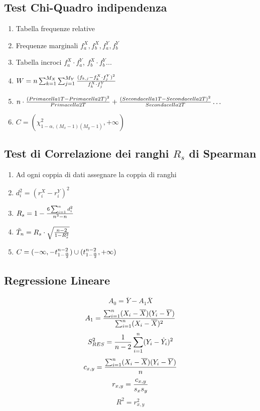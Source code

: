 \documentclass[12pt]{article}
\begin{document}
    \subsection{Test Chi-Quadro indipendenza}
    \begin{enumerate}
        \item Tabella frequenze relative
        \item Frequenze marginali $f^X_a, f^X_b, f^Y_a, f^Y_b$
        \item Tabella incroci $f^X_a \cdot f^Y_a$, $f^X_b \cdot f^Y_b$...
        \item $W = n \sum_{k=1}^{M_X} \sum_{j=1}^{M_Y} {{(f_{k,j} - f_k^X \cdot f_j^Y)^2} \over f_k^X \cdot f_j^Y}$
        \item $n \cdot {(Prima cella 1T - Prima cella 2T)^2 \over Prima cella 2T} + {(Seconda cella 1T - Seconda cella 2T)^2 \over Seconda cella 2T} \dots$
        \item $C = (\chi^2_{1-\alpha, (M_x - 1)(M_y - 1)}, +\infty)$
    \end{enumerate}
    \subsection{Test di Correlazione dei ranghi $R_s$ di Spearman}
    \begin{enumerate}
        \item Ad ogni coppia di dati assegnare la coppia di ranghi
        \item $d_i^2 = (r_i^X - r_i^Y)^2$
        \item $R_s = 1 - {{6\sum_{i = 1}^n d_i^2}\over{n^3 - n}}$
        \item $\tilde{T}_n = R_s \cdot \sqrt{{n-2}\over{1- R_s^2}}$
        \item $C = (-\infty, -t_{1-{\alpha \over 2}}^{n-2}) \cup (t_{1-{\alpha \over 2}}^{n-2}, +\infty)$
    \end{enumerate}

    \newpage
    \subsection{Regressione Lineare}
    $$A_0 = \overline{Y} - A_1\overline{X}$$
    $$A_1 = {{\sum_{i=1}^n(X_i - \overline{X})(Y_i - \overline{Y})} \over {\sum_{i=1}^n(X_i - \overline{X})^2}}$$
    $$S^2_{RES} = {1\over{n-2}} \sum_{i=1}^n(Y_i - \hat{Y}_i)^2$$
    $$c_{x,y} = {{\sum_{i=1}^n(X_i - \overline{X})(Y_i - \overline{Y})}\over{n}}$$
    $$r_{x,y} = {c_{x,y}\over{s_xs_y}}$$
    $$R^2 = r_{x,y}^2$$
\end{document}
